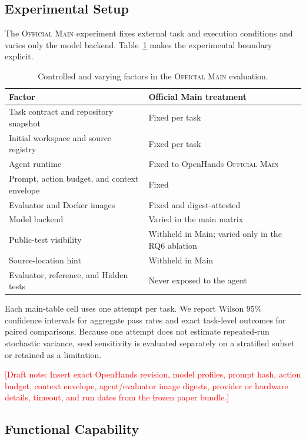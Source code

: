\documentclass[acmsmall,anonymous,review,screen]{acmart}
\newcommand{\mainprotocol}{\textsc{Official Main}\xspace}
\newcommand{\draftnote}[1]{\textcolor{red}{[Draft note: #1]}}
\begin{document}
\subsection{Experimental Setup}

The \mainprotocol experiment fixes external task and execution conditions and
varies only the model backend. Table~\ref{tab:factors} makes the experimental
boundary explicit.

\begin{table}[t]
  \caption{Controlled and varying factors in the \mainprotocol evaluation.}
  \label{tab:factors}
  \centering
  \begin{tabularx}{\textwidth}{@{}p{}X@{}}
    \toprule
    \textbf{Factor} & \textbf{Official Main treatment} \\
    \midrule
    Task contract and repository snapshot & Fixed per task \\
    Initial workspace and source registry & Fixed per task \\
    Agent runtime & Fixed to OpenHands \mainprotocol \\
    Prompt, action budget, and context envelope & Fixed \\
    Evaluator and Docker images & Fixed and digest-attested \\
    Model backend & Varied in the main matrix \\
    Public-test visibility & Withheld in Main; varied only in the RQ6 ablation \\
    Source-location hint & Withheld in Main \\
    Evaluator, reference, and Hidden tests & Never exposed to the agent \\
    \bottomrule
  \end{tabularx}
\end{table}

Each main-table cell uses one attempt per task. We report Wilson 95\%
confidence intervals for aggregate pass rates and exact task-level outcomes for
paired comparisons. Because one attempt does not estimate repeated-run
stochastic variance, seed sensitivity is evaluated separately on a stratified
subset or retained as a limitation.

\draftnote{Insert exact OpenHands revision, model profiles, prompt hash,
action budget, context envelope, agent/evaluator image digests, provider or
hardware details, timeout, and run dates from the frozen paper bundle.}

\subsection{Functional Capability}
\end{document}
